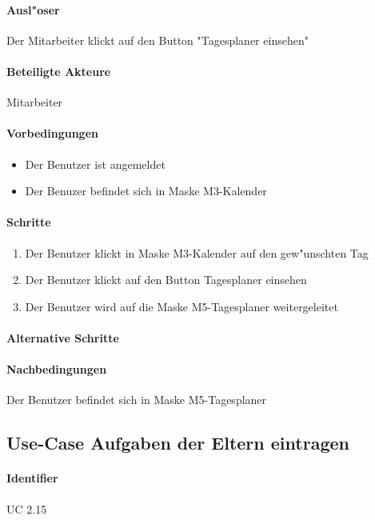   \paragraph{Ausl"oser}
  Der Mitarbeiter klickt auf den Button "Tagesplaner einsehen"
  \paragraph{Beteiligte Akteure}   \leavevmode \newline
    Mitarbeiter
  \paragraph{Vorbedingungen}
  \begin{itemize}
   \item Der Benutzer ist angemeldet
   \item Der Benuzer befindet sich in Maske M3-Kalender
  \end{itemize}

  \paragraph{Schritte}
  \begin{enumerate}
   \item Der Benutzer klickt in Maske M3-Kalender auf den gew"unschten Tag
   \item Der Benutzer klickt auf den Button \dq Tagesplaner einsehen\dq
   \item Der Benutzer wird auf die Maske M5-Tagesplaner weitergeleitet
  \end{enumerate}

  \paragraph{Alternative Schritte}
  \paragraph{Nachbedingungen}
  Der Benutzer befindet sich in Maske M5-Tagesplaner

 
 \newpage
 \subsection{Use-Case Aufgaben der Eltern eintragen}
  \paragraph{Identifier}
  UC 2.15

